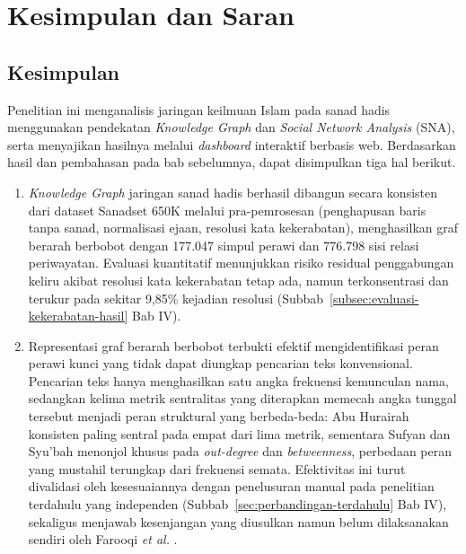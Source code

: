 \chapter{Kesimpulan dan Saran}

\section{Kesimpulan}

Penelitian ini menganalisis jaringan keilmuan Islam pada sanad hadis menggunakan pendekatan \textit{Knowledge Graph} dan \textit{Social Network Analysis} (SNA), serta menyajikan hasilnya melalui \textit{dashboard} interaktif berbasis web. Berdasarkan hasil dan pembahasan pada bab sebelumnya, dapat disimpulkan tiga hal berikut.

\begin{enumerate}
	\item \textit{Knowledge Graph} jaringan sanad hadis berhasil dibangun secara konsisten dari dataset Sanadset 650K melalui pra-pemrosesan (penghapusan baris tanpa sanad, normalisasi ejaan, resolusi kata kekerabatan), menghasilkan graf berarah berbobot dengan 177.047 simpul perawi dan 776.798 sisi relasi periwayatan. Evaluasi kuantitatif menunjukkan risiko residual penggabungan keliru akibat resolusi kata kekerabatan tetap ada, namun terkonsentrasi dan terukur pada sekitar 9,85\% kejadian resolusi (Subbab~\ref{subsec:evaluasi-kekerabatan-hasil} Bab IV).

	\item Representasi graf berarah berbobot terbukti efektif mengidentifikasi peran perawi kunci yang tidak dapat diungkap pencarian teks konvensional. Pencarian teks hanya menghasilkan satu angka frekuensi kemunculan nama, sedangkan kelima metrik sentralitas yang diterapkan memecah angka tunggal tersebut menjadi peran struktural yang berbeda-beda: Abu Hurairah konsisten paling sentral pada empat dari lima metrik, sementara Sufyan dan Syu'bah menonjol khusus pada \textit{out-degree} dan \textit{betweenness}, perbedaan peran yang mustahil terungkap dari frekuensi semata. Efektivitas ini turut divalidasi oleh kesesuaiannya dengan penelusuran manual pada penelitian terdahulu yang independen (Subbab~\ref{sec:perbandingan-terdahulu} Bab IV), sekaligus menjawab kesenjangan yang diusulkan namun belum dilaksanakan sendiri oleh Farooqi \textit{et al.} \cite{FAROOQI2024110439}.


\end{enumerate}
